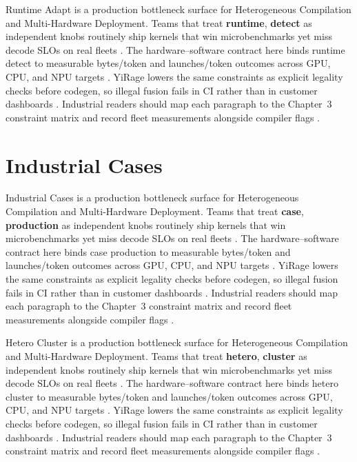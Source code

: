 Runtime Adapt is a production bottleneck surface for Heterogeneous Compilation and Multi-Hardware Deployment. Teams that treat \textbf{runtime}, \textbf{detect} as independent knobs routinely ship kernels that win microbenchmarks yet miss decode SLOs on real fleets \citep{nvidia2022hopper,amd2024aie}. The hardware--software contract here binds runtime detect to measurable bytes/token and launches/token outcomes across GPU, CPU, and NPU targets \citep{semianalysis2024tma,dlbook}. YiRage lowers the same constraints as explicit legality checks before codegen, so illegal fusion fails in CI rather than in customer dashboards \citep{amd2024xdna,dao2022flashattention}. Industrial readers should map each paragraph to the Chapter~3 constraint matrix and record fleet measurements alongside compiler flags \citep{amd2024aie,kwon2023vllm}.

\section{Industrial Cases}
\label{sec:industrial_cases}

Industrial Cases is a production bottleneck surface for Heterogeneous Compilation and Multi-Hardware Deployment. Teams that treat \textbf{case}, \textbf{production} as independent knobs routinely ship kernels that win microbenchmarks yet miss decode SLOs on real fleets \citep{semianalysis2024tma,dlbook}. The hardware--software contract here binds case production to measurable bytes/token and launches/token outcomes across GPU, CPU, and NPU targets \citep{amd2024xdna,dao2022flashattention}. YiRage lowers the same constraints as explicit legality checks before codegen, so illegal fusion fails in CI rather than in customer dashboards \citep{amd2024aie,kwon2023vllm}. Industrial readers should map each paragraph to the Chapter~3 constraint matrix and record fleet measurements alongside compiler flags \citep{dlbook,nvidia2024cudagraphs}.

Hetero Cluster is a production bottleneck surface for Heterogeneous Compilation and Multi-Hardware Deployment. Teams that treat \textbf{hetero}, \textbf{cluster} as independent knobs routinely ship kernels that win microbenchmarks yet miss decode SLOs on real fleets \citep{memoryfloor2026,amd2024xdna}. The hardware--software contract here binds hetero cluster to measurable bytes/token and launches/token outcomes across GPU, CPU, and NPU targets \citep{nvidia2022hopper,amd2024aie}. YiRage lowers the same constraints as explicit legality checks before codegen, so illegal fusion fails in CI rather than in customer dashboards \citep{semianalysis2024tma,dlbook}. Industrial readers should map each paragraph to the Chapter~3 constraint matrix and record fleet measurements alongside compiler flags \citep{amd2024xdna,dao2022flashattention}.


